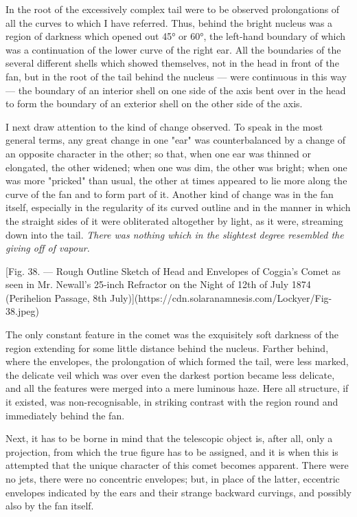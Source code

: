 \documentclass[a4paper, 12pt, oneside, polutonikogreek, english]{article}
\begin{document}
In the root of the excessively complex tail were to be observed prolongations of all the curves to which I have referred. Thus, behind the bright nucleus was a region of darkness which opened out 45° or 60°, the left-hand boundary of which was a continuation of the lower curve of the right ear. All the boundaries of the several different shells which showed themselves, not in the head in front of the fan, but in the root of the tail behind the nucleus --- were continuous in this way --- the boundary of an interior shell on one side of the axis bent over in the head to form the boundary of an exterior shell on the other side of the axis.

I next draw attention to the kind of change observed. To speak in the most general terms, any great change in one "ear" was counterbalanced by a change of an opposite character in the other; so that, when one ear was thinned or elongated, the other widened; when one was dim, the other was bright; when one was more "pricked" than usual, the other at times appeared to lie more along the curve of the fan and to form part of it. Another kind of change was in the fan itself, especially in the regularity of its curved outline and in the manner in which the straight sides of it were obliterated altogether by light, as it were, streaming down into the tail. \emph{There was nothing which in the slightest degree resembled the giving off of vapour.}

[Fig. 38. --- Rough Outline Sketch of Head and Envelopes of Coggia's Comet as seen in Mr. Newall's 25-inch Refractor on the Night of 12th of July 1874 (Perihelion Passage, 8th July)](https://cdn.solaranamnesis.com/Lockyer/Fig-38.jpeg)

The only constant feature in the comet was the exquisitely soft darkness of the region extending for some little distance behind the nucleus. Farther behind, where the envelopes, the prolongation of which formed the tail, were less marked, the delicate veil which was over even the darkest portion became less delicate, and all the features were merged into a mere luminous haze. Here all structure, if it existed, was non-recognisable, in striking contrast with the region round and immediately behind the fan.

Next, it has to be borne in mind that the telescopic object is, after all, only a projection, from which the true figure has to be assigned, and it is when this is attempted that the unique character of this comet becomes apparent. There were no jets, there were no concentric envelopes; but, in place of the latter, eccentric envelopes indicated by the ears and their strange backward curvings, and possibly also by the fan itself.
\end{document}
